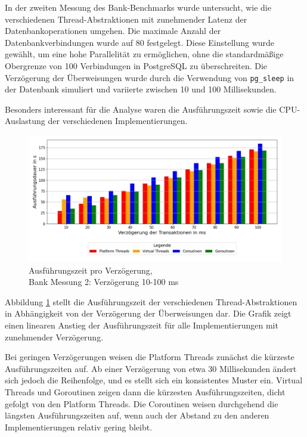 \documentclass[fontsize=12pt,paper=a4,twoside=semi,parskip=half-,headsepline,headinclude]{scrreprt}
\begin{document}
In der zweiten Messung des Bank-Benchmarks wurde untersucht, wie die verschiedenen Thread-Abstraktionen mit zunehmender Latenz der Datenbankoperationen umgehen. Die maximale Anzahl der Datenbankverbindungen wurde auf 80 festgelegt. Diese Einstellung wurde gewählt, um eine hohe Parallelität zu ermöglichen, ohne die standardmäßige Obergrenze von 100 Verbindungen in PostgreSQL zu überschreiten. Die Verzögerung der Überweisungen wurde durch die Verwendung von \texttt{pg\_sleep} in der Datenbank simuliert und variierte zwischen 10 und 100 Millisekunden.

Besonders interessant für die Analyse waren die Ausführungszeit sowie die CPU-Auslastung der verschiedenen Implementierungen.

\begin{figure}[H]
	\centering
	\includegraphics[scale=0.5]{figures/bank/delay80/execution_time_plot.png}
	\caption{Ausführungszeit pro Verzögerung,\\ Bank Messung 2: Verzögerung 10-100 ms}
	\label{fig:bankDelay80Zeit}
\end{figure}

Abbildung \ref{fig:bankDelay80Zeit} stellt die Ausführungszeit der verschiedenen Thread-Abstraktionen in Abhängigkeit von der Verzögerung der Überweisungen dar. Die Grafik zeigt einen linearen Anstieg der Ausführungszeit für alle Implementierungen mit zunehmender Ver\-zö\-ge\-rung.

Bei geringen Verzögerungen weisen die Platform Threads zunächst die kürzeste Aus\-füh\-rungs\-zei\-ten auf. Ab einer Verzögerung von etwa 30 Millisekunden ändert sich jedoch die Reihenfolge, und es stellt sich ein konsistentes Muster ein. Virtual Threads und Goroutinen zeigen dann die kürzesten Ausführungszeiten, dicht gefolgt von den Platform Threads. Die Coroutinen weisen durchgehend die längsten Ausführungszeiten auf, wenn auch der Abstand zu den anderen Implementierungen relativ gering bleibt.
\end{document}
